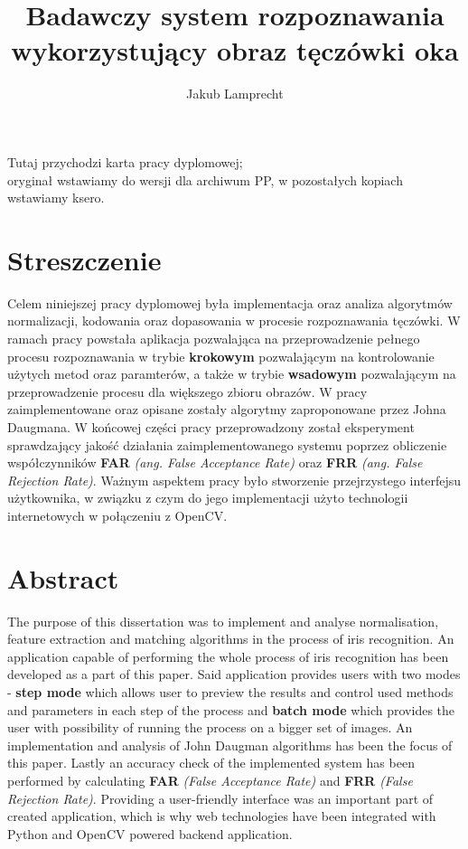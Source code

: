 \documentclass[10pt,polish,a4paper,oneside]{ppfcmthesis}
\author{Jakub Lamprecht}
\title{Badawczy system rozpoznawania wykorzystujący obraz tęczówki oka}
\begin{document}
\frontmatter\pagestyle{empty}\maketitle\cleardoublepage 

\thispagestyle{empty}\vspace*{\fill}\begin{center}Tutaj przychodzi karta pracy dyplomowej;\\oryginał wstawiamy do wersji dla archiwum PP, w pozostałych kopiach wstawiamy ksero.\end{center}\vfill\cleardoublepage 

\thispagestyle{empty}
\section*{Streszczenie}

Celem niniejszej pracy dyplomowej była implementacja oraz analiza algorytmów normalizacji,
kodowania oraz dopasowania w procesie rozpoznawania tęczówki. W ramach pracy powstała aplikacja
pozwalająca na przeprowadzenie pełnego procesu rozpoznawania w trybie \textbf{krokowym} pozwalającym
na kontrolowanie użytych metod oraz paramterów, a także w trybie \textbf{wsadowym} pozwalającym na przeprowadzenie
procesu dla większego zbioru obrazów. W pracy zaimplementowane oraz opisane zostały algorytmy zaproponowane przez
Johna Daugmana. W końcowej części pracy przeprowadzony został eksperyment sprawdzający jakoś\'c
działania zaimplementowanego systemu poprzez obliczenie współczynników \textbf{FAR} \textit{(ang. False Acceptance Rate)}
oraz \textbf{FRR} \textit{(ang. False Rejection Rate)}. Ważnym aspektem pracy było stworzenie
przejrzystego interfejsu użytkownika, w związku z czym do jego implementacji użyto technologii
internetowych w połączeniu z OpenCV.

\section*{Abstract}

The purpose of this dissertation was to implement and analyse normalisation, feature extraction
and matching algorithms in the process of iris recognition. An application capable of performing
the whole process of iris recognition has been developed as a part of this paper. Said application
provides users with two modes - \textbf{step mode} which allows user to preview the results and control used
methods and parameters in each step of the process and \textbf{batch mode} which provides the user
with possibility of running the process on a bigger set of images. An implementation and analysis
of John Daugman algorithms has been the focus of this paper. Lastly an accuracy check of the implemented
system has been performed by calculating \textbf{FAR} \textit{(False Acceptance Rate)} and \textbf{FRR} \textit{(False Rejection Rate)}.
Providing a user-friendly interface was an important part of created application, which is why
web technologies have been integrated with Python and OpenCV powered backend application.
 \vfill\cleardoublepage
\end{document}
